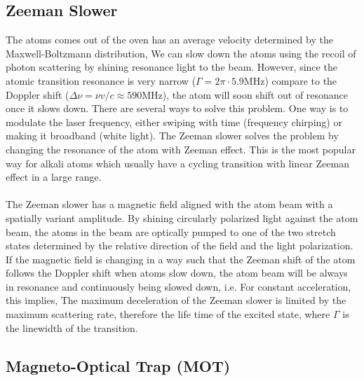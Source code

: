 \subsection{Zeeman Slower}\label{theory:zeeman}

The atoms comes out of the oven has an average velocity determined by the Maxwell-Boltzmann distribution,
We can slow down the atoms using the recoil of photon scattering by shining resonance light to the beam. However, since the atomic transition resonance is very narrow ($\Gamma=2\pi\cdot5.9\text{MHz}$) compare to the Doppler shift ($\Delta\nu=\nu v/c\approx590\text{MHz}$), the atom will soon shift out of resonance once it slows down. There are several ways to solve this problem. One way is to modulate the laser frequency, either swiping with time (frequency chirping) or making it broadband (white light). The Zeeman slower solves the problem by changing the resonance of the atom with Zeeman effect. This is the most popular way for alkali atoms which usually have a cycling transition with linear Zeeman effect in a large range.\\
\\
The Zeeman slower has a magnetic field aligned with the atom beam with a spatially variant amplitude. By shining circularly polarized light against the atom beam, the atoms in the beam are optically pumped to one of the two stretch states determined by the relative direction of the field and the light polarization. If the magnetic field is changing in a way such that the Zeeman shift of the atom follows the Doppler shift when atoms slow down, the atom beam will be always in resonance and continuously being slowed down, i.e.
For constant acceleration, this implies,
The maximum deceleration of the Zeeman slower is limited by the maximum scattering rate, therefore the life time of the excited state,
where $\Gamma$ is the linewidth of the transition.

\subsection{Magneto-Optical Trap (MOT)}\label{theory:mot}

